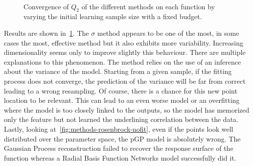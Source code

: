 \begin{figure}[!h]
~
\caption{Convergence of $Q_2$ of the different methods on each function by varying the initial learning sample size with a fixed budget.}
\label{fig:methods-cv}
\end{figure}

Results are shown in~\cref{fig:methods-cv}. The $\sigma$ method appears to be one of the most, in some cases the most, effective method but it also exhibits more variability. Increasing dimensionality seems only to improve slightly this behaviour. There are multiple explanations to this phenomenon. The method relies on the use of an inference about the variance of the model. Starting from a given sample, if the fitting process does not converge, the prediction of the variance will be far from correct leading to a wrong resampling. Of course, there is a chance for this new point location to be relevant. This can lead to an even worse model or an overfitting where the model is too closely linked to the outputs, so the model has memorized only the feature but not learned the underlining correlation between the data. Lastly, looking at~\cref{fig:methods-rosenbrock-nofit}, even if the points look well distributed over the parameter space, the pGP model is absolutely wrong. The Gaussian Process reconstruction failed to recover the response surface of the function whereas a Radial Basis Function Networks model successfully did it.

